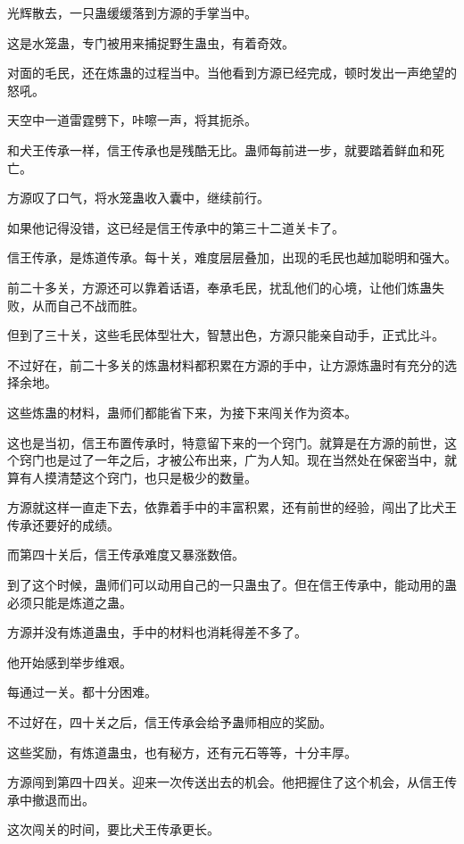
\begin{this_body}

光辉散去，一只蛊缓缓落到方源的手掌当中。

这是水笼蛊，专门被用来捕捉野生蛊虫，有着奇效。

对面的毛民，还在炼蛊的过程当中。当他看到方源已经完成，顿时发出一声绝望的怒吼。

天空中一道雷霆劈下，咔嚓一声，将其扼杀。

和犬王传承一样，信王传承也是残酷无比。蛊师每前进一步，就要踏着鲜血和死亡。

方源叹了口气，将水笼蛊收入囊中，继续前行。

如果他记得没错，这已经是信王传承中的第三十二道关卡了。

信王传承，是炼道传承。每十关，难度层层叠加，出现的毛民也越加聪明和强大。

前二十多关，方源还可以靠着话语，奉承毛民，扰乱他们的心境，让他们炼蛊失败，从而自己不战而胜。

但到了三十关，这些毛民体型壮大，智慧出色，方源只能亲自动手，正式比斗。

不过好在，前二十多关的炼蛊材料都积累在方源的手中，让方源炼蛊时有充分的选择余地。

这些炼蛊的材料，蛊师们都能省下来，为接下来闯关作为资本。

这也是当初，信王布置传承时，特意留下来的一个窍门。就算是在方源的前世，这个窍门也是过了一年之后，才被公布出来，广为人知。现在当然处在保密当中，就算有人摸清楚这个窍门，也只是极少的数量。

方源就这样一直走下去，依靠着手中的丰富积累，还有前世的经验，闯出了比犬王传承还要好的成绩。

而第四十关后，信王传承难度又暴涨数倍。

到了这个时候，蛊师们可以动用自己的一只蛊虫了。但在信王传承中，能动用的蛊必须只能是炼道之蛊。

方源并没有炼道蛊虫，手中的材料也消耗得差不多了。

他开始感到举步维艰。

每通过一关。都十分困难。

不过好在，四十关之后，信王传承会给予蛊师相应的奖励。

这些奖励，有炼道蛊虫，也有秘方，还有元石等等，十分丰厚。

方源闯到第四十四关。迎来一次传送出去的机会。他把握住了这个机会，从信王传承中撤退而出。

这次闯关的时间，要比犬王传承更长。


\end{this_body}
